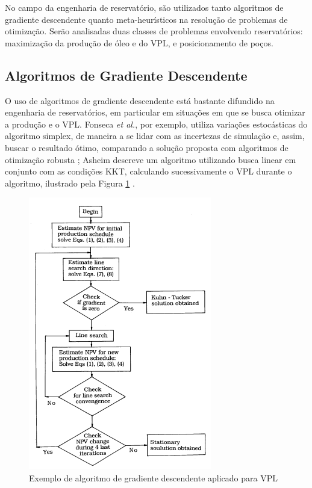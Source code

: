 No campo da engenharia de reservat\'{o}rio, s\~{a}o utilizados tanto algoritmos de gradiente descendente quanto meta-heur\'{i}sticos na resolu\c{c}\~{a}o de problemas de otimiza\c{c}\~{a}o. Ser\~{a}o analisadas duas classes de problemas envolvendo reservat\'{o}rios: maximiza\c{c}\~{a}o da produ\c{c}\~{a}o de \'{o}leo e do VPL, e posicionamento de po\c{c}os.
\nocite{EOR:Intro}


\subsection{Algoritmos de Gradiente Descendente}
O uso de algoritmos de gradiente descendente est\'{a} bastante difundido na engenharia de reservat\'{o}rios, em particular em situa\c{c}\~{o}es em que se busca otimizar a produ\c{c}\~{a}o e o VPL. Fonseca \textit{et al.}, por exemplo, utiliza varia\c{c}\~{o}es estoc\'{a}sticas do algoritmo simplex, de maneira a se lidar com as incertezas de simula\c{c}\~{a}o e, assim, buscar o resultado \'{o}timo, comparando a solu\c{c}\~{a}o proposta com algoritmos de otimiza\c{c}\~{a}o robusta \cite{fonseca}; Asheim descreve um algoritmo utilizando busca linear em conjunto com as condi\c{c}\~{o}es KKT, calculando sucessivamente o VPL durante o algoritmo, ilustrado pela Figura \ref{fig:asheim1} \cite{asheim88}.

\begin{figure}[H]
	\centering
	\includegraphics[width=.5\textwidth]{figs/revisao/revisao_asheim1}
	\caption{Exemplo de algoritmo de gradiente descendente aplicado para VPL \cite{asheim88}\label{fig:asheim1}}
\end{figure}

